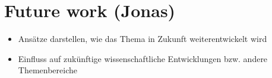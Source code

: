 \section{Future work (Jonas)}
\begin{itemize}
\item Ansätze darstellen, wie das Thema in Zukunft weiterentwickelt wird
\item Einfluss auf zukünftige wissenschaftliche Entwicklungen bzw. andere Themenbereiche
\end{itemize}

